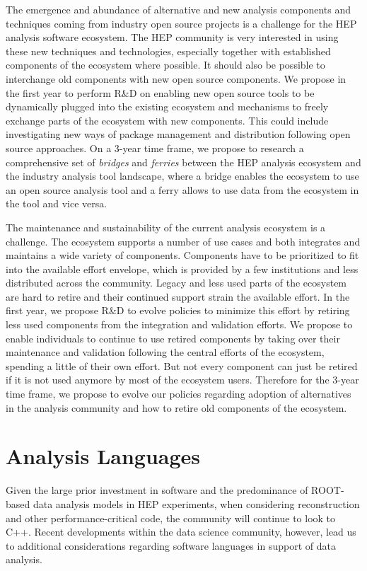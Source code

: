 \documentclass[12pt,a4paper]{article}
\begin{document}
The emergence and abundance of alternative and new analysis components and techniques coming from industry open source projects is a challenge for the HEP analysis software ecosystem. The HEP community is very interested in using these new techniques and technologies, especially together with established components of the ecosystem where possible. It should also be possible to interchange old components with new open source components. We propose in the first year to perform R\&D on enabling new open source tools to be dynamically plugged into the existing ecosystem and mechanisms to freely exchange parts of the ecosystem with new components. This could include investigating new ways of package management and distribution following open source approaches. On a 3-year time frame, we propose to research a comprehensive set of {\it bridges} and {\it ferries} between the HEP analysis ecosystem and the industry analysis tool landscape, where a bridge enables the ecosystem to use an open source analysis tool and a ferry allows to use data from the ecosystem in the tool and vice versa.

The maintenance and sustainability of the current analysis ecosystem is a challenge. The ecosystem supports a number of use cases and both integrates and maintains a wide variety of components. Components have to be prioritized to fit into the available effort envelope, which is provided by a few institutions and less distributed across the community. Legacy and less used parts of the ecosystem are hard to retire and their continued support strain the available effort. In the first year, we propose R\&D to evolve policies to minimize this effort by retiring less used components from the integration and validation efforts. We propose to enable individuals to continue to use retired components by taking over their maintenance and validation following the central efforts of the ecosystem, spending a little of their own effort. 
But not every component can just be retired if it is not used anymore by most of the ecosystem users. Therefore for the 3-year time frame, we propose to evolve our policies regarding adoption of alternatives in the analysis community and how to retire old components of the ecosystem.

\section{Analysis Languages}

Given the large prior investment in software and the predominance of ROOT-based data analysis models in HEP experiments, when considering reconstruction and other performance-critical code, the community will continue to look to C++. Recent developments within the data science community, however, lead us to additional considerations regarding software languages in support of data analysis.
\end{document}
